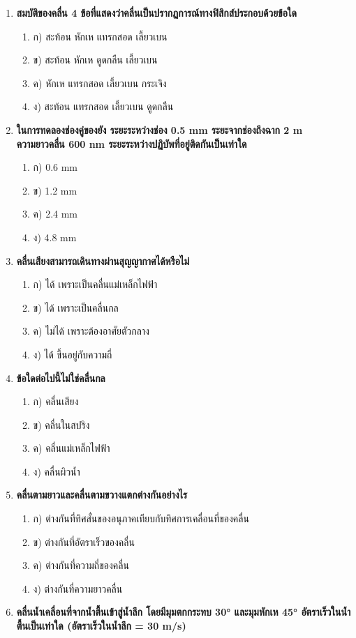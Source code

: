 \documentclass[12pt]{article}
\begin{document}
\begin{enumerate}
\item \textbf{สมบัติของคลื่น 4 ข้อที่แสดงว่าคลื่นเป็นปรากฏการณ์ทางฟิสิกส์ประกอบด้วยข้อใด}
\begin{enumerate}
\item ก) สะท้อน หักเห แทรกสอด เลี้ยวเบน
\item ข) สะท้อน หักเห ดูดกลืน เลี้ยวเบน
\item ค) หักเห แทรกสอด เลี้ยวเบน กระเจิง
\item ง) สะท้อน แทรกสอด เลี้ยวเบน ดูดกลืน
\end{enumerate}
\item \textbf{ในการทดลองช่องคู่ของยัง ระยะระหว่างช่อง 0.5 mm ระยะจากช่องถึงฉาก 2 m ความยาวคลื่น 600 nm ระยะระหว่างปฏิบัพที่อยู่ติดกันเป็นเท่าใด}
\begin{enumerate}
\item ก) 0.6 mm
\item ข) 1.2 mm
\item ค) 2.4 mm
\item ง) 4.8 mm
\end{enumerate}
\item \textbf{คลื่นเสียงสามารถเดินทางผ่านสุญญากาศได้หรือไม่}
\begin{enumerate}
\item ก) ได้ เพราะเป็นคลื่นแม่เหล็กไฟฟ้า
\item ข) ได้ เพราะเป็นคลื่นกล
\item ค) ไม่ได้ เพราะต้องอาศัยตัวกลาง
\item ง) ได้ ขึ้นอยู่กับความถี่
\end{enumerate}
\item \textbf{ข้อใดต่อไปนี้ไม่ใช่คลื่นกล}
\begin{enumerate}
\item ก) คลื่นเสียง
\item ข) คลื่นในสปริง
\item ค) คลื่นแม่เหล็กไฟฟ้า
\item ง) คลื่นผิวน้ำ
\end{enumerate}
\item \textbf{คลื่นตามยาวและคลื่นตามขวางแตกต่างกันอย่างไร}
\begin{enumerate}
\item ก) ต่างกันที่ทิศสั่นของอนุภาคเทียบกับทิศการเคลื่อนที่ของคลื่น
\item ข) ต่างกันที่อัตราเร็วของคลื่น
\item ค) ต่างกันที่ความถี่ของคลื่น
\item ง) ต่างกันที่ความยาวคลื่น
\end{enumerate}
\item \textbf{คลื่นน้ำเคลื่อนที่จากน้ำตื้นเข้าสู่น้ำลึก โดยมีมุมตกกระทบ 30° และมุมหักเห 45° อัตราเร็วในน้ำตื้นเป็นเท่าใด (อัตราเร็วในน้ำลึก = 30 m/s)}

\end{enumerate}
\end{document}

